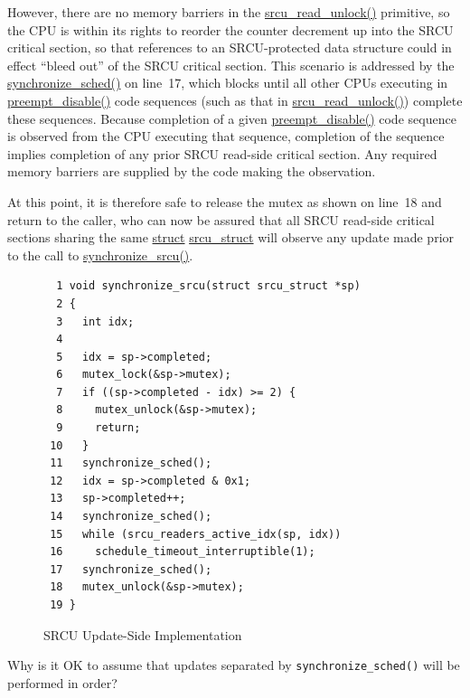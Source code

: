However, there are no memory barriers in the \url{srcu_read_unlock()}
primitive, so the CPU is within its rights to reorder the counter
decrement up into the SRCU critical section, so that references to
an SRCU-protected data structure could in effect ``bleed out'' of the
SRCU critical section.
This scenario is addressed by the \url{synchronize_sched()} on line~17,
which blocks until all other CPUs executing in \url{preempt_disable()}
code sequences (such as that in \url{srcu_read_unlock()}) complete these
sequences.
Because completion of a given \url{preempt_disable()} code sequence
is observed from the CPU executing that sequence, completion of the
sequence implies completion of any prior SRCU read-side critical section.
Any required memory barriers are supplied by the code making the
observation.

At this point, it is therefore safe to release the mutex as shown
on line~18 and return to the caller, who can now be assured that
all SRCU read-side critical sections sharing the same
\url{struct} \url{srcu_struct}
will observe any update made prior to the call to \url{synchronize_srcu()}.

\begin{figure}[htbp]
{ \scriptsize
\begin{verbatim}
  1 void synchronize_srcu(struct srcu_struct *sp)
  2 {
  3   int idx;
  4
  5   idx = sp->completed;
  6   mutex_lock(&sp->mutex);
  7   if ((sp->completed - idx) >= 2) {
  8     mutex_unlock(&sp->mutex);
  9     return;
 10   }
 11   synchronize_sched();
 12   idx = sp->completed & 0x1;
 13   sp->completed++;
 14   synchronize_sched();
 15   while (srcu_readers_active_idx(sp, idx))
 16     schedule_timeout_interruptible(1);
 17   synchronize_sched();
 18   mutex_unlock(&sp->mutex);
 19 }
\end{verbatim}
}
\caption{SRCU Update-Side Implementation}
\label{fig:app:rcuimpl:Update-Side Implementation}
\end{figure}

\QuickQuiz{}
	Why is it OK to assume that updates separated by
	{\tt synchronize\_sched()} will be performed in order?
 \QuickQuizEnd

